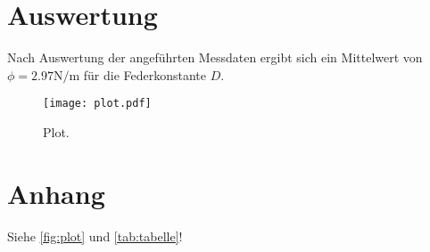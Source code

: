 %

%
\section{Auswertung}
\label{sec:Auswertung}

Nach Auswertung der angeführten Messdaten ergibt sich ein Mittelwert von $\phi = 2.97 \unit{\newton \per \meter}$ für
die Federkonstante $D$.
\begin{figure}
  \centering
  \texttt{[image: plot.pdf]}
  \caption{Plot.}
  \label{fig:plot}
\end{figure}




\section{Anhang}
Siehe \autoref{fig:plot} und \autoref{tab:tabelle}!

%
